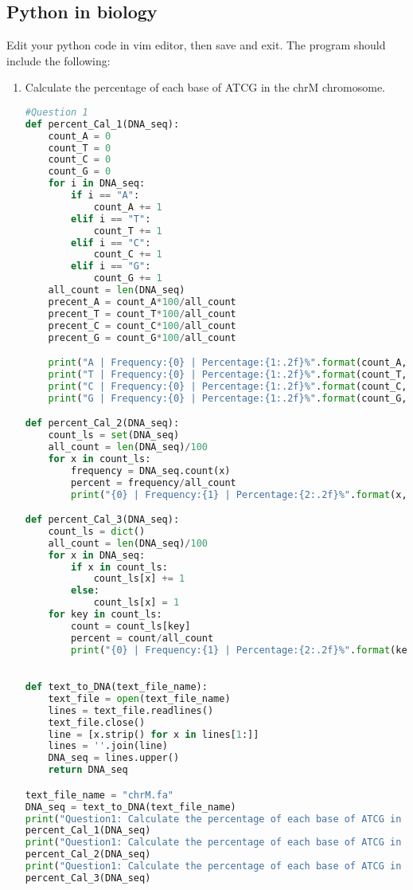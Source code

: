 \documentclass[a4paper]{article}
\begin{document}
    \subsection{Python in biology}
Edit your python code in vim editor, then save and exit. The program should include the following:
    \begin{enumerate}
    	\item Calculate the percentage of each base of ATCG in the chrM chromosome.
    	\begin{lstlisting}[language=Python]
#Question 1
def percent_Cal_1(DNA_seq):
    count_A = 0
    count_T = 0 
    count_C = 0
    count_G = 0
    for i in DNA_seq:
        if i == "A":
            count_A += 1
        elif i == "T":
            count_T += 1
        elif i == "C":            
            count_C += 1
        elif i == "G":
            count_G += 1
    all_count = len(DNA_seq)
    precent_A = count_A*100/all_count
    precent_T = count_T*100/all_count
    precent_C = count_C*100/all_count
    precent_G = count_G*100/all_count    

    print("A | Frequency:{0} | Percentage:{1:.2f}%".format(count_A,precent_A))
    print("T | Frequency:{0} | Percentage:{1:.2f}%".format(count_T,precent_T))
    print("C | Frequency:{0} | Percentage:{1:.2f}%".format(count_C,precent_C))
    print("G | Frequency:{0} | Percentage:{1:.2f}%".format(count_G,precent_G))

def percent_Cal_2(DNA_seq):
    count_ls = set(DNA_seq)
    all_count = len(DNA_seq)/100
    for x in count_ls:
        frequency = DNA_seq.count(x)
        percent = frequency/all_count
        print("{0} | Frequency:{1} | Percentage:{2:.2f}%".format(x,frequency,percent))

def percent_Cal_3(DNA_seq):
    count_ls = dict()
    all_count = len(DNA_seq)/100
    for x in DNA_seq:
        if x in count_ls:
            count_ls[x] += 1
        else:
            count_ls[x] = 1
    for key in count_ls:
        count = count_ls[key]
        percent = count/all_count
        print("{0} | Frequency:{1} | Percentage:{2:.2f}%".format(key,count,percent))
    

def text_to_DNA(text_file_name):
    text_file = open(text_file_name)
    lines = text_file.readlines()
    text_file.close()
    line = [x.strip() for x in lines[1:]]
    lines = ''.join(line)
    DNA_seq = lines.upper()
    return DNA_seq

text_file_name = "chrM.fa"
DNA_seq = text_to_DNA(text_file_name)
print("Question1: Calculate the percentage of each base of ATCG in the chrM chromosome by Funtion1.1:")
percent_Cal_1(DNA_seq)
print("Question1: Calculate the percentage of each base of ATCG in the chrM chromosome by by Funtion1.2:")
percent_Cal_2(DNA_seq)
print("Question1: Calculate the percentage of each base of ATCG in the chrM chromosome by by Funtion1.3:")
percent_Cal_3(DNA_seq)


\end{lstlisting}
\end{enumerate}
\end{document}

